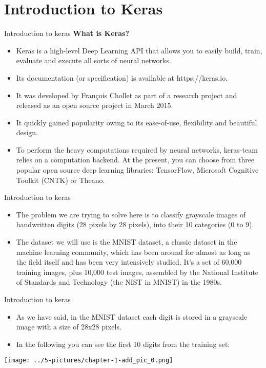 \documentclass[11pt]{beamer}
\begin{document}
\section{Introduction to Keras}
\begin{frame}{Introduction to keras}
\textbf{What is Keras?}
	\begin{itemize}
	\item Keras is a high-level Deep Learning API that allows you to easily build, train, evaluate and execute all sorts of neural networks. 
	\item Its documentation (or specification) is available at https://keras.io. \item It was developed by François Chollet as part of a research project and released as an open source project in March 2015. 
\item It quickly gained popularity owing to its ease-of-use, flexibility and beautiful design. 
\item To perform the heavy computations required by neural networks, keras-team relies on a computation backend. At the present, you can choose from three popular open source deep learning libraries: TensorFlow, Microsoft Cognitive Toolkit (CNTK) or Theano.
	\end{itemize}
\end{frame}
\begin{frame}{Introduction to keras}
	\begin{itemize}
	\item The problem we are trying to solve here is to classify grayscale images of handwritten digits (28 pixels by 28 pixels), into their 10 categories (0 to 9). 
	\item The dataset we will use is the MNIST dataset, a classic dataset in the machine learning community, which has been around for almost as long as the field itself and has been very intensively studied. It's a set of 60,000 training images, plus 10,000 test images, assembled by the National Institute of Standards and Technology (the NIST in MNIST) in the 1980s. 
	\end{itemize}
\end{frame}
\begin{frame}{Introduction to keras}
	\begin{itemize}
		\item As we have said, in the MNIST dataset each digit is stored in a grayscale image with a size of 28x28 pixels. 
		\item In the following you can see the first 10 digits from the training set:
	\end{itemize}
	\begin{center}
	\texttt{[image: ../5-pictures/chapter-1-add\_pic\_0.png]}
	\end{center}
\end{frame}
\end{document}
